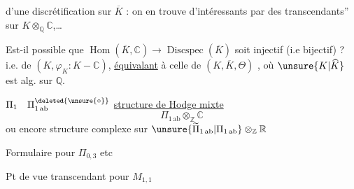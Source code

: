 \uline{} d'une discrétification sur $\overline K$ : on en trouve
d'intéressants par  des
 transcendants'' sur
$K\otimes_{\mathbb Q}\mathbb C$,\ldots\deleted{\unsure{\ldots}}

Est-il possible que $\operatorname{Hom}(\overline K,\mathbb C)\longrightarrow
\operatorname{Discspec}(\overline K)$ soit injectif (i.e bijectif) ?
i.e. de $(K,\varphi_K:K\mathbin{-}\mathbb C)$, \uline{équivalant} à celle
de $(K,\overline K,\Theta)$ ,
 où $\unsure{K|\widehat K}$ est alg. sur $\mathbb Q$.

$\Pi_1\quad\Pi_{1\,\mathrm{ab}}^{\deleted{\unsure{\circ}}}$\quad
\uline{structure de Hodge mixte}
\[
\Pi_{1\,\mathrm{ab}}\otimes_{\mathbb Z}\mathbb C
\]
ou encore structure complexe sur $\unsure{\widetilde\Pi_{1\,\mathrm{ab}}|\Pi_{1\,\mathrm{ab}}}\otimes_{\mathbb Z}\mathbb R$

Formulaire pour $\Pi_{0,3}$ etc

Pt de vue transcendant pour $M_{1,1}$

